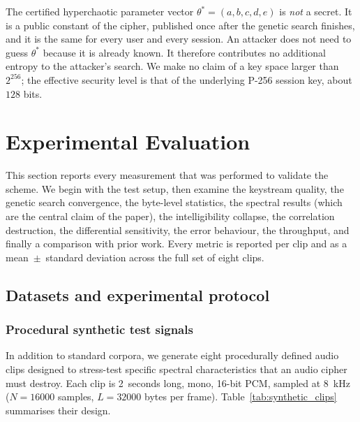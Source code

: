 \documentclass[pdflatex,sn-mathphys-num]{sn-jnl}%
\theoremstyle{thmstyleone}%
\theoremstyle{thmstyletwo}%
\theoremstyle{thmstylethree}%
\begin{document}
The certified hyperchaotic parameter vector $\theta^\ast=(a,b,c,d,e)$ is \emph{not} a secret. It is a public constant of the cipher, published once after the genetic search finishes, and it is the same for every user and every session. An attacker does not need to guess $\theta^\ast$ because it is already known. It therefore contributes no additional entropy to the attacker's search. We make no claim of a key space larger than $2^{256}$; the effective security level is that of the underlying P-256 session key, about $128$ bits.

\section{Experimental Evaluation}
\label{sec:experiments}

This section reports every measurement that was performed to validate the scheme. We begin with the test setup, then examine the keystream quality, the genetic search convergence, the byte-level statistics, the spectral results (which are the central claim of the paper), the intelligibility collapse, the correlation destruction, the differential sensitivity, the error behaviour, the throughput, and finally a comparison with prior work. Every metric is reported per clip and as a mean~$\pm$~standard deviation across the full set of eight clips.

\subsection{Datasets and experimental protocol}
\label{sec:datasets}

\subsubsection{Procedural synthetic test signals}
In addition to standard corpora, we generate eight procedurally defined audio 
clips designed to stress-test specific spectral characteristics that an audio 
cipher must destroy. Each clip is 2~seconds long, mono, 16-bit PCM, sampled at 
8~kHz ($N=16000$ samples, $L=32000$ bytes per frame). Table~\ref{tab:synthetic_clips} 
summarises their design.
\end{document}
